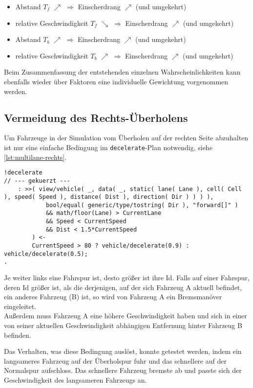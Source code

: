 \begin{itemize}
    \itemsep0em
    \item Abstand $ T_{f} $ $ \nearrow $ $ \Longrightarrow $ Einscherdrang $ \nearrow $ (und umgekehrt)
    \item relative Geschwindigkeit $ T_{f} $ $ \searrow $ $ \Longrightarrow $ Einscherdrang $ \nearrow $ (und umgekehrt)
    \item Abstand $ T_{b} $ $ \nearrow $ $ \Longrightarrow $ Einscherdrang $ \nearrow $ (und umgekehrt)
    \item relative Geschwindigkeit $ T_{b} $ $ \nearrow $ $ \Longrightarrow $ Einscherdrang $ \nearrow $ (und umgekehrt)
\end{itemize}

Beim Zusammenfassung der entstehenden einzelnen Wahrscheinlichkeiten kann ebenfalls wieder über Faktoren eine individuelle Gewichtung vorgenommen werden.






\subsection{Vermeidung des Rechts-Überholens}

Um Fahrzeuge in der Simulation vom Überholen auf der rechten Seite abzuhalten ist nur eine einfache Bedingung im \texttt{decelerate}-Plan notwendig, siehe \cref{lst:multilane-rechts}.

\begin{minipage}[hptb]{0.95\textwidth}
\begin{lstlisting}[style=asl, 
                   keywords={Lane,CurrentLane}, 
                   keywords={[2]}, 
                   keywords={[3]}, 
                   caption={Auszug aus Agentenscript: Überholverbot rechts},
                   label={lst:multilane-rechts}]      
!decelerate
// --- gekuerzt ---
    : >>( view/vehicle( _, data( _, static( lane( Lane ), cell( Cell ), speed( Speed ), distance( Dist ), direction( Dir ) ) ) ), 
            bool/equal( generic/type/tostring( Dir ), "forward[]" ) 
            && math/floor(Lane) > CurrentLane
            && Speed < CurrentSpeed
            && Dist < 1.5*CurrentSpeed
        ) <-
        CurrentSpeed > 80 ? vehicle/decelerate(0.9) : vehicle/decelerate(0.5);
.\end{lstlisting}
\end{minipage}

Je weiter links eine Fahrspur ist, desto größer ist ihre Id.
Falls auf einer Fahrspur, deren Id größer ist, als die derjenigen, auf der sich Fahrzeug A aktuell befindet, ein anderes Fahrzeug (B) ist, so wird von Fahrzeug A ein Bremsmanöver eingeleitet.
\\
Außerdem muss Fahrzeug A eine höhere Geschwindigkeit haben und sich in einer von seiner aktuellen Geschwindigkeit abhängigen Entfernung hinter Fahrzeug B befinden. 

Das Verhalten, was diese Bedingung auslöst, konnte getestet werden, indem ein langsameres Fahrzeug auf der Überholspur fuhr und das schnellere auf der Normalspur aufschloss.
Das schnellere Fahrzeug bremste ab und passte sich der Geschwindigkeit des langsameren Fahrzeugs an.
